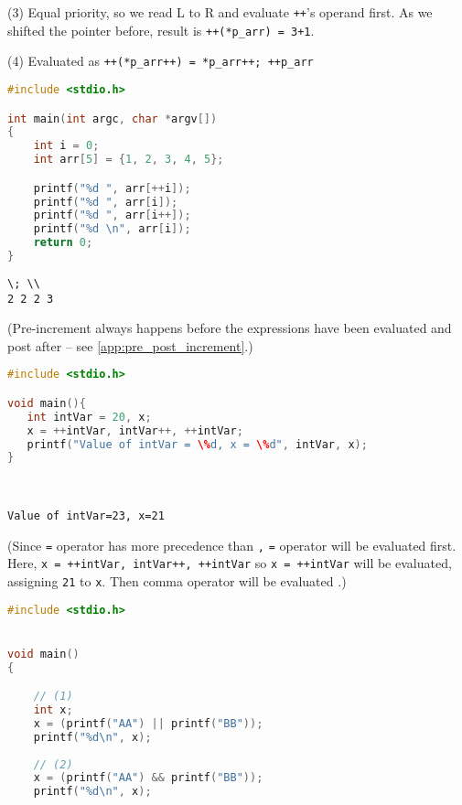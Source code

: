 \begin{exmp}
\begin{multicols}{2}
(3) Equal priority, so we read L to R and evaluate \texttt{++}'s operand first. As we shifted the pointer before, result is \texttt{++(*p\_arr) = 3+1}. 

(4) Evaluated as \texttt{++(*p\_arr++) = *p\_arr++; ++p\_arr}
\end{multicols}

\clearpage
\begin{multicols}{2}
\begin{lstlisting}[language=c]
#include <stdio.h>

int main(int argc, char *argv[])
{
	int i = 0;
	int arr[5] = {1, 2, 3, 4, 5};

	printf("%d ", arr[++i]);
	printf("%d ", arr[i]);
	printf("%d ", arr[i++]);
	printf("%d \n", arr[i]);
	return 0;
}
\end{lstlisting}
\columnbreak
\begin{verbatim}
\; \\
2 2 2 3
\end{verbatim}
(Pre-increment always happens before the expressions have been evaluated and post after -- see \ref{app:pre_post_increment}.)
\end{multicols}


\begin{multicols}{2}
\begin{lstlisting}[language=c]
#include <stdio.h>

void main(){
   int intVar = 20, x;
   x = ++intVar, intVar++, ++intVar;
   printf("Value of intVar = \%d, x = \%d", intVar, x);
}
\end{lstlisting}
\columnbreak
\; \\
\begin{verbatim}
Value of intVar=23, x=21   
\end{verbatim}
(Since \texttt{=} operator has more precedence than \texttt{,} \texttt{=} operator will be evaluated first.
Here, \texttt{x = ++intVar, intVar++, ++intVar} so
\texttt{x = ++intVar} will be evaluated, assigning \texttt{21} to \texttt{x}. Then comma operator will be evaluated \cite{aptitudequestions}.)
\end{multicols}


\begin{multicols}{2}
\begin{lstlisting}[language=c]
#include <stdio.h>


void main()
{

	// (1)
	int x;
	x = (printf("AA") || printf("BB"));
	printf("%d\n", x);
	
	// (2)
	x = (printf("AA") && printf("BB"));
	printf("%d\n", x);
	

\end{lstlisting}
\end{multicols}
\end{exmp}
